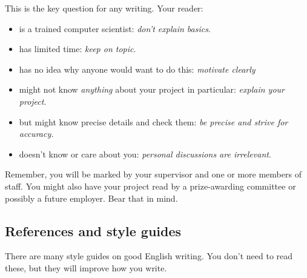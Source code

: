 \documentclass{l4proj}
\begin{document}
This is the key question for any writing. Your reader:

\begin{itemize}
    \item
    is a trained computer scientist: \emph{don't explain basics}.
    \item
    has limited time: \emph{keep on topic}.
    \item
    has no idea why anyone would want to do this: \emph{motivate clearly}
    \item
    might not know \emph{anything} about your project in particular:
    \emph{explain your project}.
    \item
    but might know precise details and check them: \emph{be precise and
    strive for accuracy.}
    \item
    doesn't know or care about you: \emph{personal discussions are
    irrelevant}.
\end{itemize}

Remember, you will be marked by your supervisor and one or more members
of staff. You might also have your project read by a prize-awarding
committee or possibly a future employer. Bear that in mind.

\subsection{References and style guides}
There are many style guides on good English writing. You don't need to
read these, but they will improve how you write.

\end{document}
